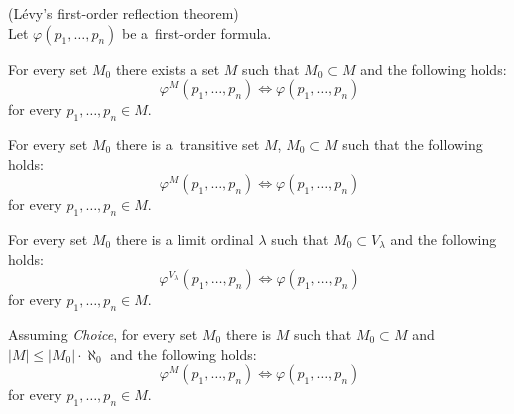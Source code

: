 \begin{theorem}{(Lévy's first-order reflection theorem)}\label{theorem:first_order_reflection}\\
Let $\varphi(p_1, \ldots, p_n)$ be a~first-order formula.
\bce[(i)]
\item For every set $M_0$ there exists a set $M$ such that $M_0 \subset M$ and the following holds:
\begin{equation}
\varphi^M(p_1, \ldots, p_n) \iff \varphi(p_1, \ldots, p_n)\label{equation:levy_theorem_i}
\end{equation}
for every $p_1, \ldots, p_n \in M$.

\item For every set $M_0$ there is a~transitive set $M$, $M_0 \subset M$ such that the following holds:
\begin{equation}
\varphi^M(p_1, \ldots, p_n) \iff \varphi(p_1, \ldots, p_n)
\end{equation}
for every $p_1, \ldots, p_n \in M$.

\item For every set $M_0$ there is a limit ordinal $\lambda$ such that $M_0 \subset V_{\lambda}$ and the following holds:
\begin{equation}
\varphi^{V_{\lambda}}(p_1, \ldots, p_n) \iff \varphi(p_1, \ldots, p_n)
\end{equation}
for every $p_1, \ldots, p_n \in M$.

\item Assuming \emph{Choice}, for every set $M_0$ there is $M$ such that $M_0 \subset M$ and $|M| \leq |M_0| \cdot \aleph_0$ and the following holds:
\begin{equation}
\varphi^M(p_1, \ldots, p_n) \iff \varphi(p_1, \ldots, p_n)
\end{equation}
for every $p_1, \ldots, p_n \in M$.
\ece
\end{theorem}

